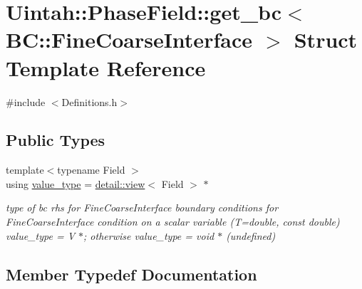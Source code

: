 \hypertarget{structUintah_1_1PhaseField_1_1get__bc_3_01BC_1_1FineCoarseInterface_01_4}{}\section{Uintah\+:\+:Phase\+Field\+:\+:get\+\_\+bc$<$ BC\+:\+:Fine\+Coarse\+Interface $>$ Struct Template Reference}
\label{structUintah_1_1PhaseField_1_1get__bc_3_01BC_1_1FineCoarseInterface_01_4}


{\ttfamily \#include $<$Definitions.\+h$>$}

\subsection*{Public Types}
\begin{DoxyCompactItemize}
\item 
{\footnotesize template$<$typename Field $>$ }\\using \hyperlink{structUintah_1_1PhaseField_1_1get__bc_3_01BC_1_1FineCoarseInterface_01_4_a65c14de3908bed624a90d1d2c3ad2b84}{value\+\_\+type} = \hyperlink{classUintah_1_1PhaseField_1_1detail_1_1view}{detail\+::view}$<$ Field $>$ $\ast$
\begin{DoxyCompactList}\small\item\em type of bc rhs for Fine\+Coarse\+Interface boundary conditions for Fine\+Coarse\+Interface condition on a scalar variable (T=double, const double) value\+\_\+type = V $\ast$; otherwise value\+\_\+type = void $\ast$ (undefined) \end{DoxyCompactList}\end{DoxyCompactItemize}


\subsection{Member Typedef Documentation}
\mbox{\label{structUintah_1_1PhaseField_1_1get__bc_3_01BC_1_1FineCoarseInterface_01_4_a65c14de3908bed624a90d1d2c3ad2b84}} 
